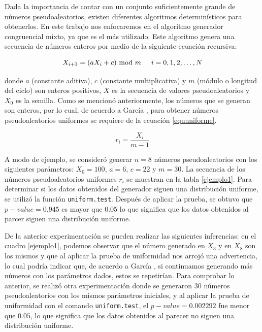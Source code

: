 \documentclass{article}
\begin{document}
Dada la importancia de contar con un conjunto suficientemente grande de números pseudoaleatorios, existen diferentes algoritmos determinísticos para obtenerlos. En este trabajo nos enfocaremos en el algoritmo generador congruencial mixto, ya que es el más utilizado. Este algoritmo genera una secuencia de números enteros por medio de la siguiente ecuación recursiva:

\begin{equation} \label{recursiva}
X_ {i+1}= (aX_{i} +c) \text{ mod } m \hspace{0,5cm}i=0, 1, 2, \dots, N
\end{equation}

\noindent donde $a$ (constante aditiva), $c$ (constante multiplicativa) y $m$ (módulo o longitud del ciclo) son enteros positivos, $X$ es la secuencia de valores pseudoaleatorios y $X_ {0}$ es la semilla. Como se mencionó anteriormente, los números que se generan son enteros, por lo cual, de acuerdo a García \cite{promodel}, para obtener números pseudoaleatorios uniformes se requiere de la ecuación \ref{equuniforme}.

\begin{equation} \label{equuniforme}
r_ {i}=\frac{X_{i}}{m-1}
\end{equation}

A modo de ejemplo, se consideró generar $n=8$ números pseudoaleatorios con los siguientes parámetros: $X_{0}=100$, $a = 6$, $c = 22$ y $m = 30$. La secuencia de los números pseudoaleatorios uniformes $r_{i}$ se muestran en la tabla \ref{ejemplo1}. Para determinar si los datos obtenidos del generador siguen una distribución uniforme, se utilizó la función \texttt{uniform.test}. Después de aplicar la prueba, se obtuvo que $p-value = 0.945$ es mayor que $0.05$ lo que significa que los datos obtenidos al parcer siguen una distribución uniforme. 

De la anterior experimentación se pueden realizar las siguientes inferencias: en el cuadro \ref{ejemplo1}, podemos observar que el número generado en $X_{3}$ y en $X_{8}$ son los mismos y que al aplicar la prueba de uniformidad nos arrojó una advertencia, lo cual podría indicar que, de acuerdo a García \cite{promodel}, si continuamos generando más números con los parámetros dados, estos se repetirían. Para comprobar lo anterior, se realizó otra experimentación donde se generaron $30$ números pseudoaleatorios con los mismos parámetros iniciales, y al aplicar la prueba de uniformidad con el comando \texttt{uniform.test}, el $p-value = 0.002292$ fue menor que $0.05$, lo que significa que los datos obtenidos al parecer no siguen una distribución uniforme.
\end{document}
